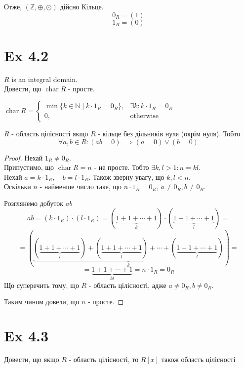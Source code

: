 \documentclass[11pt, a4paper]{article} %
\newcommand{\N}{\mathbb{N}}
\newcommand{\Z}{\mathbb{Z}}
\DeclareMathOperator{\ch}{char}
\begin{document}
Отже, $(\Z, \oplus, \odot)$ дійсно Кільце.
\[0_R = (1)\]
\[1_R = (0)\]

\newpage
\section*{Ex 4.2}
\begin{mdframed}
    $R$ is an integral domain.\\
    Довести, що $\ch R$ - просте.
\end{mdframed}

$\ch R = \begin{cases}
    \min \{k\in\N \mid k\cdot 1_R = 0_R\}, & \exists k: k\cdot 1_R = 0_R\\
    0, & \text{otherwise}
\end{cases} $

$R$ - область цілісності якщо $R$ - кільце без дільників нуля (окрім нуля).
Тобто
\[\forall a,b\in R: (ab=0) \implies (a=0) \vee (b=0)\]

\begin{proof}
    Нехай $1_R \ne 0_R$. \\
    Припустимо, що $\ch R = n$ - не просте. 
    Тобто $\exists k,l>1: n = kl$.\\
    Нехай $a = k\cdot 1_R, \quad b = l\cdot 1_R$.
    Також зверну увагу, що $k,l < n$.\\
    Оскільки $n$ - найменше число таке, що $n\cdot 1_R=0_R$, $a\ne 0_R, b\ne 0_R$.

    Розглянемо добуток $ab$
    \[ab = (k\cdot 1_R) \cdot (l \cdot 1_R) = (\underset{k}{\underbrace{1+1+\cdots+1}}) \cdot (\underset{l}{\underbrace{1+1+\cdots+1}}) = \]
    \[= \left(\underset{k}{\underbrace{(\underset{l}{\underbrace{1+1+\cdots+1}}) + (\underset{l}{\underbrace{1+1+\cdots+1}}) + \cdots + (\underset{l}{\underbrace{1+1+\cdots+1}})}}\right) = \]
    \[= \underset{kl}{\underbrace{1+1+\cdots+1}} = n\cdot 1_R = 0_R\]
    Що суперечить тому, що $R$ - область цілісності, адже $a\ne0_R, b\ne0_R$.

    Таким чином довели, що $n$ - просте.
\end{proof}

\newpage
\section*{Ex 4.3}
\begin{mdframed}
    Довести, що якщо $R$ - область цілісності, то $R[x]$ також область цілісності
\end{mdframed}
\end{document}
